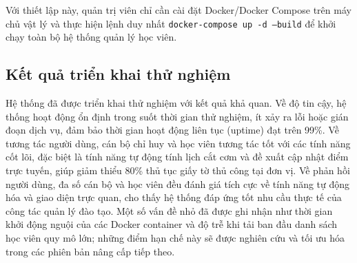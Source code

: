 \documentclass[../DoAn.tex]{subfiles}
\begin{document}
Với thiết lập này, quản trị viên chỉ cần cài đặt Docker/Docker Compose trên máy chủ vật lý và thực hiện lệnh duy nhất \texttt{docker-compose up -d --build} để khởi chạy toàn bộ hệ thống quản lý học viên.

\subsection{Kết quả triển khai thử nghiệm}
Hệ thống đã được triển khai thử nghiệm với kết quả khả quan. Về độ tin cậy, hệ thống hoạt động ổn định trong suốt thời gian thử nghiệm, ít xảy ra lỗi hoặc gián đoạn dịch vụ, đảm bảo thời gian hoạt động liên tục (uptime) đạt trên 99\%. Về tương tác người dùng, cán bộ chỉ huy và học viên tương tác tốt với các tính năng cốt lõi, đặc biệt là tính năng tự động tính lịch cắt cơm và đề xuất cập nhật điểm trực tuyến, giúp giảm thiểu 80\% thủ tục giấy tờ thủ công tại đơn vị. Về phản hồi người dùng, đa số cán bộ và học viên đều đánh giá tích cực về tính năng tự động hóa và giao diện trực quan, cho thấy hệ thống đáp ứng tốt nhu cầu thực tế của công tác quản lý đào tạo. Một số vấn đề nhỏ đã được ghi nhận như thời gian khởi động nguội của các Docker container và độ trễ khi tải ban đầu danh sách học viên quy mô lớn; những điểm hạn chế này sẽ được nghiên cứu và tối ưu hóa trong các phiên bản nâng cấp tiếp theo.
\end{document}
